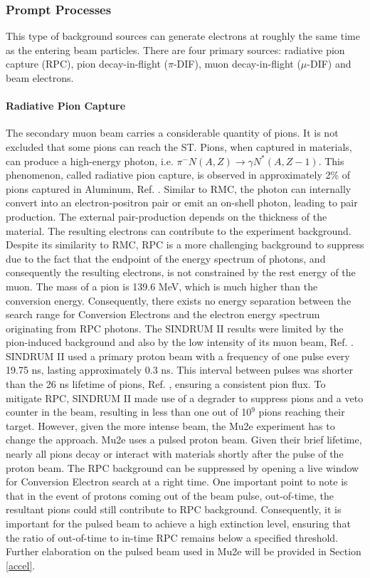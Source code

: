 \subsubsection{Prompt Processes}
This type of background sources can generate electrons at roughly the same time as 
the entering beam particles. There are four primary sources: radiative pion capture (RPC), 
pion decay-in-flight ($\pi$-DIF), muon decay-in-flight ($\mu$-DIF) and beam electrons.
\paragraph{Radiative Pion Capture}
The secondary muon beam carries a considerable quantity of pions.  It is not excluded 
that some pions can reach the ST. Pions, when captured in materials, can 
produce a high-energy photon, i.e. $\pi^- N(A,Z) \rightarrow \gamma N ^* (A,Z-1)$. 
This phenomenon, called radiative pion capture, is observed in approximately 2\% of 
pions captured in Aluminum, Ref. \cite{PhysRevC.5.1867}. Similar to RMC, the photon 
can internally convert into an electron-positron pair or emit an on-shell photon, 
leading to pair production. The external pair-production depends on the thickness 
of the material. The resulting electrons can contribute to the experiment background. 
Despite its similarity to RMC, RPC is a more challenging background to suppress due to 
the fact that the endpoint of the energy spectrum of photons, and consequently the 
resulting electrons, is not constrained by the rest energy of the muon. The mass of 
a pion is 139.6 MeV, which is much higher than the conversion energy. Consequently, 
there exists no energy separation between the search range for Conversion Electrons 
and the electron energy spectrum originating from RPC photons. The SINDRUM II results 
were limited by the pion-induced background and also by the low intensity of its muon 
beam, Ref. \cite{SINDRUMII:2006dvw}. SINDRUM II used a primary proton beam with a 
frequency of one pulse every 19.75 ns, lasting approximately 0.3 ns. This interval 
between pulses was shorter than the 26 ns lifetime of pions, Ref. \cite{zyla}, 
ensuring a consistent pion flux. To mitigate RPC, SINDRUM II made use of a degrader to suppress 
pions and a veto counter in the beam, resulting in less than one out of 10$^9$ pions reaching their 
target. However, given the more intense beam, the Mu2e experiment has to change the approach. 
Mu2e uses a pulsed proton beam. Given their brief lifetime, nearly all pions decay or 
interact with materials shortly after the pulse of the proton beam. The RPC background 
can be suppressed by opening a live window for Conversion Electron search at a right time. 
One important point to note is that in the event of protons coming out of the beam pulse, 
out-of-time, the resultant pions could still contribute to RPC background. Consequently, 
it is important for the pulsed beam to achieve a high extinction level, ensuring that the 
ratio of out-of-time to in-time RPC remains below a specified threshold. Further elaboration 
on the pulsed beam used in Mu2e will be provided in Section \ref{accel}.
